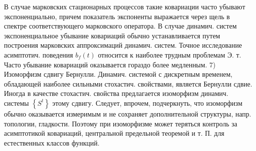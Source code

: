 \documentclass[10pt]{article}
\begin{document}
В случае марковских стационарных процессов такие ковариации часто убывают экспоненциально, причем показатель экспоненты выражается через щель в спектре соответствующего марковского оператора. В случае динамич. систем экспоненциальное убывание ковариаций обычно устанавливается путем построения марковских аппроксимаций динамич. систем. Точное исследование асимптотич. поведения $b_{f}(t)$ относится к наиболее трудным проблемам Э. т. Часто убывание ковариаций оказывается гораздо более медленным. 7) Изоморфизм сдвигу Бернулли. Динамич. системой с дискретным временем, обладающей наиболее сильными стохастич. свойствами, является Бернулли сдвие. Иногда в качестве стохастич. свойства предлагается изоморфизм динамич. системы $\left\{S^{t}\right\}$ этому сдвигу. Следует, впрочем, подчеркнуть, что изоморфизм обычно оказывается измеримым и не сохраняет дополнительной структуры, напр. топологии, гладкости. Поэтому при изоморфизме может теряться контроль за асимптотикой ковариаций, центральной предельной теоремой и т. П. для естественных классов функций.
\end{document}
